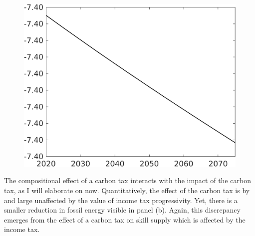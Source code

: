\begin{figure}[h!!]
\begin{minipage}[]{0.32\textwidth}
 	\end{minipage}
 	\begin{minipage}[]{0.32\textwidth}
 		\includegraphics[width=1\textwidth]{../../codding_model/own_basedOnFried/optimalPol_010922_revision/figures/all_13Sept22/CompTaufPER_bytaul_Reg0_hhhl_spillover0_nsk0_xgr0_knspil0_sep0_LFlimit0_emsbase0_countec0_GovRev0_etaa0.79_lgd0.png}
 	\end{minipage}
 \end{figure}
 
  
The compositional effect of a carbon tax interacts with the impact of the carbon tax, as I will elaborate on now.
  Quantitatively, the effect of the carbon tax is by and large unaffected by the value of income tax progressivity.
 Yet, there is a smaller reduction in fossil energy visible in panel (b).
 Again, this discrepancy emerges from the effect of a carbon tax on skill supply which is affected by the income tax. 


